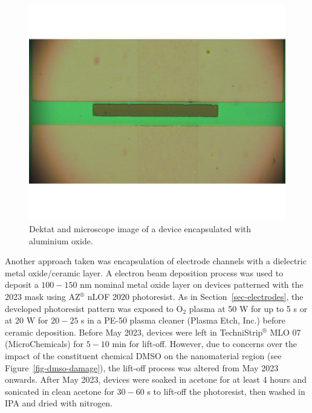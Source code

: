 \documentclass[
  a4paper,
]{scrbook}
\begin{document}
\begin{figure}
\begin{minipage}[t]{0.47\linewidth}
{{\includegraphics{./figures/ch4/al2o3_encapsulation.png}

}

}

\end{minipage}%

\caption{\label{fig-dektat-dielectric-layer}Dektat and microscope image
of a device encapsulated with aluminium oxide.}

\end{figure}

Another approach taken was encapsulation of electrode channels with a
dielectric metal oxide/ceramic layer. A electron beam deposition process
was used to deposit a \(100-150\) nm nominal metal oxide layer on
devices patterned with the 2023 mask using AZ\(^\circledR\) nLOF 2020
photoresist. As in Section~\ref{sec-electrodes}, the developed
photoresist pattern was exposed to O\(_2\) plasma at 50 W for up to 5 s
or at 20 W for \(20-25\) s in a PE-50 plasma cleaner (Plasma Etch, Inc.)
before ceramic deposition. Before May 2023, devices were left in
TechniStrip\(^\circledR\) MLO 07 (MicroChemicals) for \(5-10\) min for
lift-off. However, due to concerns over the impact of the constituent
chemical DMSO on the nanomaterial region (see
Figure~\ref{fig-dmso-damage}), the lift-off process was altered from May
2023 onwards. After May 2023, devices were soaked in acetone for at
least 4 hours and sonicated in clean acetone for \(30-60\) s to lift-off
the photoresist, then washed in IPA and dried with nitrogen.
\end{document}
